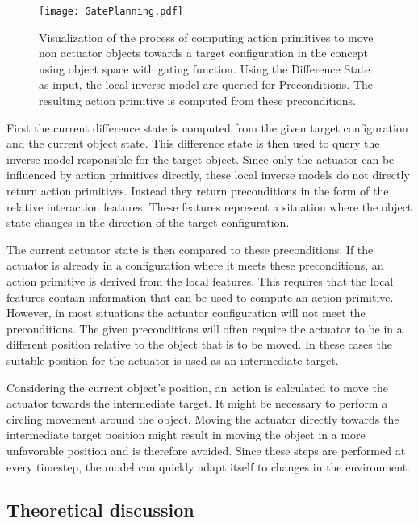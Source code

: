 \begin{figure}
	\centering
	\texttt{[image: GatePlanning.pdf]}
	\caption{Visualization of the process of computing action primitives to move non actuator objects towards a target configuration in the concept using object space with gating function. Using the Difference State as input, the local inverse model are queried for Preconditions. The resulting action primitive is computed from these preconditions.}
	\label{fig:GatePlanning}
\end{figure}
	
First the current difference state is computed from the given target configuration and the current object state. This difference state is then used to query the inverse model responsible for the target object. Since only the actuator can be influenced by action primitives directly, these local inverse models do not directly return action primitives. Instead they return preconditions in the form of the relative interaction features. These features represent a situation where the object state changes in the direction of the target configuration. 
	
The current actuator state is then compared to these preconditions. If the actuator is already in a configuration where it meets these preconditions, an action primitive is derived from the local features. This requires that the local features contain information that can be used to compute an action primitive.
However, in most situations the actuator configuration will not meet the preconditions. The given preconditions will often require the actuator to be in a different position relative to the object that is to be moved. In these cases the suitable position for the actuator is used as an intermediate target. 

Considering the current object's position, an action is calculated to move the actuator towards the intermediate target. It might be necessary to perform a circling movement around the object. Moving the actuator directly towards the intermediate target position might result in moving the object in a more unfavorable position and is therefore avoided. Since these steps are performed at every timestep, the model can quickly adapt itself to changes in the environment.
	
\subsection{Theoretical discussion \label{sec:gateTheoDisc}}

